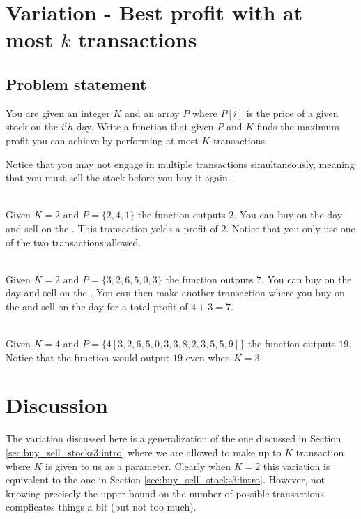 \section{Variation - Best profit with at most $k$ transactions}
\label{sec:buy_sell_stocks4:intro}

\subsection{Problem statement}
\begin{exercise}
    You are given an integer $K$ and an array $P$ where $P[i]$ is the price of a given stock on the $i^th$ day.
    Write a function that given $P$ and $K$ finds the maximum profit you can achieve by performing at most $K$ transactions.
    
    Notice that you may not engage in multiple transactions simultaneously, meaning that you must sell the stock before you buy it again.

    \begin{example}
    \label{ex:buy_sell_stocks4:exmaple1}
        \hfill \\
        Given $K=2$ and $P=\{2,4,1\}$ the function outputs $2$. 
        You can buy on the  day and sell on the . This transaction yelds a profit of $2$. Notice that you only use one of the two transactions allowed.
    \end{example}

    \begin{example}
        \label{ex:buy_sell_stocks4:exmaple2}
            \hfill \\
            Given $K=2$ and $P=\{3,2,6,5,0,3\}$ the function outputs $7$. 
            You can buy on the  day and sell on the . You can then make another transaction where you buy on the  and sell on the  day for a total profit of $4+3=7$.
    \end{example}

    \begin{example}
        \label{ex:buy_sell_stocks4:exmaple3}
            \hfill \\
            Given $K=4$ and $P=\{4
            [3,2,6,5,0,3,3,8,2,3,5,5,9]\}$ the function outputs $19$. 
            Notice that the function would output $19$ even when $K=3$.
    \end{example}
\end{exercise}


\section{Discussion}
\label{buy_sell_stocks4:sec:discussion}
The variation discussed here is a generalization of the one discussed in Section \ref{sec:buy_sell_stocks3:intro} where we are allowed to make up to $K$ transaction where $K$ is given to us as a parameter.
Clearly when $K=2$ this variation is equivalent to the one in Section \ref{sec:buy_sell_stocks3:intro}. 
However, not knowing precisely the upper bound on the number of possible transactions complicates things a bit (but not too much).

